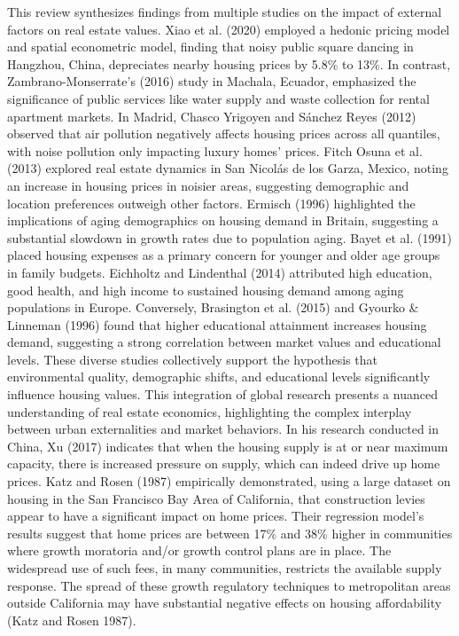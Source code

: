 \documentclass{aip-cp}
\begin{document}
This review synthesizes findings from multiple studies on the impact of external factors on real estate values. Xiao et al. (2020) employed a hedonic pricing model and spatial econometric model, finding that noisy public square dancing in Hangzhou, China, depreciates nearby housing prices by 5.8\% to 13\%. In contrast, Zambrano-Monserrate's (2016) study in Machala, Ecuador, emphasized the significance of public services like water supply and waste collection for rental apartment markets. In Madrid, Chasco Yrigoyen and Sánchez Reyes (2012) observed that air pollution negatively affects housing prices across all quantiles, with noise pollution only impacting luxury homes' prices. Fitch Osuna et al. (2013) explored real estate dynamics in San Nicolás de los Garza, Mexico, noting an increase in housing prices in noisier areas, suggesting demographic and location preferences outweigh other factors.
Ermisch (1996) highlighted the implications of aging demographics on housing demand in Britain, suggesting a substantial slowdown in growth rates due to population aging. Bayet et al. (1991) placed housing expenses as a primary concern for younger and older age groups in family budgets. Eichholtz and Lindenthal (2014) attributed high education, good health, and high income to sustained housing demand among aging populations in Europe. Conversely, Brasington et al. (2015) and Gyourko \& Linneman (1996) found that higher educational attainment increases housing demand, suggesting a strong correlation between market values and educational levels.
These diverse studies collectively support the hypothesis that environmental quality, demographic shifts, and educational levels significantly influence housing values. This integration of global research presents a nuanced understanding of real estate economics, highlighting the complex interplay between urban externalities and market behaviors.
In his research conducted in China, Xu (2017) indicates that when the housing supply is at or near maximum capacity, there is increased pressure on supply, which can indeed drive up home prices. Katz and Rosen (1987) empirically demonstrated, using a large dataset on housing in the San Francisco Bay Area of California, that construction levies appear to have a significant impact on home prices. Their regression model's results suggest that home prices are between 17\% and 38\% higher in communities where growth moratoria and/or growth control plans are in place. The widespread use of such fees, in many communities, restricts the available supply response. The spread of these growth regulatory techniques to metropolitan areas outside California may have substantial negative effects on housing affordability (Katz and Rosen 1987).
\end{document}
